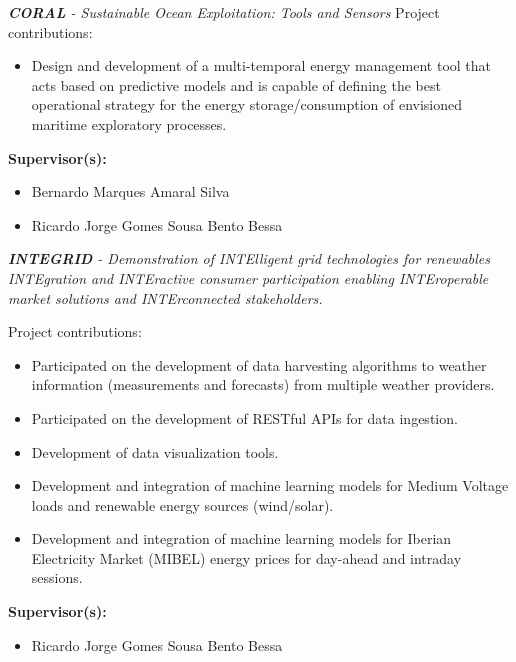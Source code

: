 \documentclass{mycv}
\begin{document}
\begin{myitemize}
	\item \textit{\textbf{CORAL} - Sustainable Ocean Exploitation: Tools and Sensors}
	\vspace{0.2cm}
	Project contributions:
	\begin{itemize}[itemsep=1px]

	\item Design and development of a multi-temporal energy management tool that acts based on predictive models and is capable of defining the best operational strategy for the energy storage/consumption of envisioned maritime exploratory processes.
	\end{itemize}
	\vspace{0.2cm}
	
	\textbf{Supervisor(s):}
	\begin{itemize}
		\item Bernardo Marques Amaral Silva
		\item Ricardo Jorge Gomes Sousa Bento Bessa
	\end{itemize}
		
	\vspace{0.4cm}
	
	\item \textit{\textbf{INTEGRID} - Demonstration of INTElligent grid technologies for renewables INTEgration and INTEractive consumer participation enabling INTEroperable market solutions and INTErconnected stakeholders.}
	\vspace{0.2cm}
	
	Project contributions:
	\begin{itemize}[itemsep=1px]
	\item Participated on the development of data harvesting algorithms to weather information (measurements and forecasts) from multiple weather providers.
	\item Participated on the development of RESTful APIs for data ingestion.
	\item Development of data visualization tools.
	\item Development and integration of machine learning models for Medium Voltage loads and renewable energy sources (wind/solar).
	\item Development and integration of machine learning models for Iberian Electricity Market (MIBEL) energy prices for day-ahead and intraday sessions.
	\end{itemize}	
	
	\vspace{0.2cm}
	
	\textbf{Supervisor(s):}
	\begin{itemize}
		\item Ricardo Jorge Gomes Sousa Bento Bessa
	\end{itemize}
		
\end{myitemize}
\end{document}
